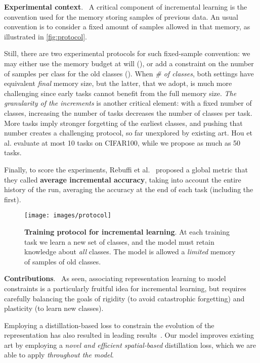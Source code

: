 \documentclass[runningheads]{llncs}
\newcommand{\parag}[1]{\vspace{0.2cm}\noindent\textbf{#1}.\ }
\begin{document}
\parag{Experimental context} A critical component of incremental learning is the convention used for the memory storing samples of previous data. An usual convention is to consider a fixed amount of samples allowed in that memory, as illustrated in \autoref{fig:protocol}.

Still, there are two experimental protocols for such fixed-sample convention: we may either use the memory budget at will (), or add a constraint on the number of samples per class for the old classes (). When \textit{\# of classes}, both settings have equivalent \textit{final} memory size, but the latter, that we adopt, is much more challenging since early tasks cannot benefit from the full memory size.
\textit{The granularity of the increments} is another critical element: with a fixed number of classes, increasing the number of tasks decreases the number of classes per task. More tasks imply stronger forgetting of the earliest classes, and pushing that number creates a challenging protocol, so far unexplored by existing art. Hou et al. evaluate at most 10 tasks on CIFAR100, while we propose as much as 50 tasks.

Finally, to score the experiments, Rebuffi et al.~\cite{rebuffi2017icarl} proposed a global metric that they called \textbf{average incremental accuracy}, taking into account the entire history of the run, averaging the accuracy at the end of each task (including the first).


\begin{figure}[tb]
\begin{center}
    \texttt{[image: images/protocol]}
\end{center}
   \caption{\textbf{Training protocol for incremental learning}. At each training task we learn a new set of classes, and the model must retain knowledge about \textit{all} classes. The model is allowed a \textit{limited} memory of samples of old classes.}
    \label{fig:protocol}
\end{figure}

\parag{Contributions} As seen, associating representation learning to model constraints is a particularly fruitful idea for incremental learning, but requires carefully balancing the goals of rigidity (to avoid catastrophic forgetting) and plasticity (to learn new classes). 

Employing a distillation-based loss to constrain the evolution of the representation has also resulted in leading results~\cite{hou2019ucir,wu2019bias_correction,peng2019m2kd,dhar2019learning_without_memorizing_gradcam}. Our model improves existing art by employing a \textit{novel and efficient spatial-based} distillation loss, which we are able to apply \textit{throughout the model}.
\end{document}
